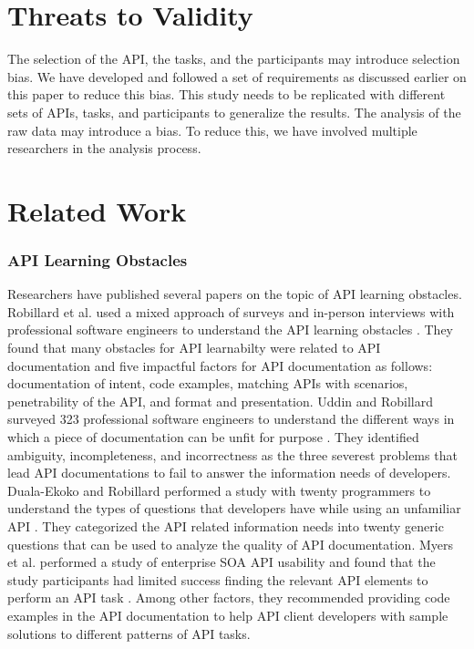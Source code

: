 \documentclass[conference]{IEEEtran}
\begin{document}
\section{Threats to Validity}
\label{sec:threat}
  The selection of the API, the tasks, and the participants may introduce selection bias. We have developed and followed a set of requirements as discussed earlier on this paper to reduce this bias. This study needs to be replicated with different sets of APIs, tasks, and participants to generalize the results. The analysis of the raw data may introduce a bias. To reduce this, we have involved multiple researchers in the analysis process.


\section{Related Work}
\label{sec:related_work}
\subsubsection{API Learning Obstacles}
  Researchers have published several papers on the topic of API learning obstacles. Robillard et al. used a mixed approach of surveys and in-person interviews with professional software engineers to understand the API learning obstacles \cite{Robillard_what_makes} \cite{Robillard_a_field_study}. They found that many obstacles for API learnabilty were related to API documentation and five impactful factors for API documentation as follows: documentation of intent, code examples, matching APIs with scenarios, penetrability of the API, and format and presentation. Uddin and Robillard surveyed 323 professional software engineers to understand the different ways in which a piece of documentation can be unfit for purpose \cite{g_uddin}. They identified ambiguity, incompleteness, and incorrectness as the three severest problems that lead API documentations to fail to answer the information needs of developers. Duala-Ekoko and Robillard performed a study with twenty programmers to understand the types of questions that developers have while using an unfamiliar API \cite{Duala-Ekoko:2012:AAQ:2337223.2337255}. They categorized the API related information needs into twenty generic questions that can be used to analyze the quality of API documentation. Myers et al. performed a study of enterprise SOA API usability and found that the study participants had limited success finding the relevant API elements to perform an API task \cite{Myers_study}. Among other factors, they recommended providing code examples in the API documentation to help API client developers with sample solutions to different patterns of API tasks.
\end{document}
